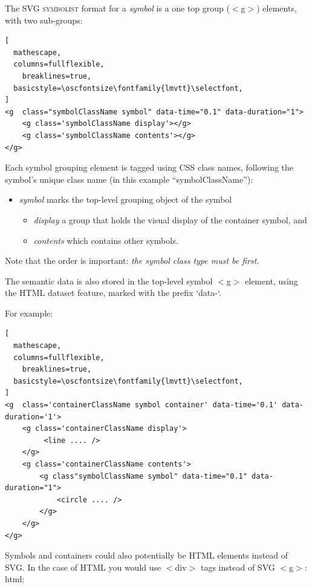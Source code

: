 \documentclass{article}
\def\symbolist{\textsc{symbolist}\xspace}
\def\oscfontsize{\footnotesize}
\begin{document}
\begin{minipage}{\linewidth}
The SVG \symbolist format for a \textit{symbol} is a one top group ($<$g$>$) elements, with two sub-groups:

\begin{lstlisting}[
  mathescape,
  columns=fullflexible,
    breaklines=true,
  basicstyle=\oscfontsize\fontfamily{lmvtt}\selectfont,
]
<g  class="symbolClassName symbol" data-time="0.1" data-duration="1">
    <g class='symbolClassName display'></g>
    <g class='symbolClassName contents'></g>
</g>
\end{lstlisting}
\end{minipage}



Each symbol grouping element is tagged using CSS class names, following the symbol's unique class name (in this example ``symbolClassName''):
\begin{itemize}\itemsep0pt 
\item \textit{symbol} marks the top-level grouping object of the symbol
\begin{itemize}\itemsep0pt 
  \item \textit{display} a group that holds the visual display of the container symbol, and
  \item \textit{contents} which contains other symbols.
  \end{itemize}
\end{itemize}



Note that the order is important: \textit{the symbol class type must be first}.

The semantic data is also stored in the top-level symbol $<$g$>$ element, using the HTML dataset feature, marked with the prefix `data-`.

For example:

\begin{lstlisting}[
  mathescape,
  columns=fullflexible,
    breaklines=true,
  basicstyle=\oscfontsize\fontfamily{lmvtt}\selectfont,
]
<g  class='containerClassName symbol container' data-time='0.1' data-duration='1'>
    <g class='containerClassName display'>
         <line .... />
    </g>
    <g class='containerClassName contents'>
        <g class"symbolClassName symbol" data-time="0.1" data-duration="1">
            <circle .... />
        </g>
    </g>
</g>
\end{lstlisting}


Symbols and containers could also potentially be HTML elements instead of SVG. In the case of HTML you would use $<$div$>$ tags instead of SVG $<$g$>$:
html:
\end{document}
